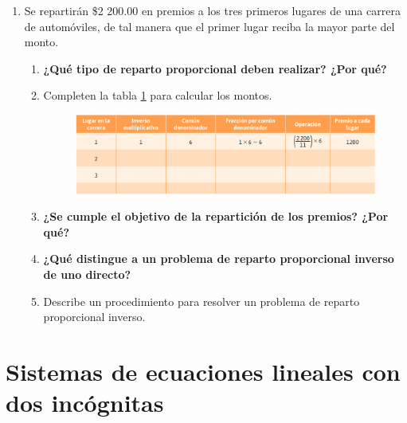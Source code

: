 \documentclass[11pt]{book}
\begin{document}
\begin{enumerate}
  \item Se repartirán \$2 200.00 en premios a los tres primeros lugares de una carrera de automóviles, de tal manera que el primer lugar reciba la mayor parte del monto.
        \begin{enumerate}
          \item \textbf{¿Qué tipo de reparto proporcional deben realizar? ¿Por qué?}\\[0.5cm]
          \item  Completen la tabla \ref{tab:reparto_carrera} para calcular los montos.
                \begin{figure}[H]
                  \centering
                  \includegraphics[width=\textwidth]{reparto_carrera}
                  \label{tab:reparto_carrera}
                \end{figure}
          \item \textbf{¿Se cumple el objetivo de la repartición de los premios? ¿Por qué?}\\[0.5cm]
          \item \textbf{¿Qué distingue a un problema de reparto proporcional inverso de uno directo?}\\[0.5cm]
          \item Describe un procedimiento para resolver un problema de reparto proporcional inverso.
        \end{enumerate}

\end{enumerate}


\newpage \thispagestyle{plain}
\section{Sistemas de ecuaciones lineales con dos inc\'ognitas}
\end{document}
